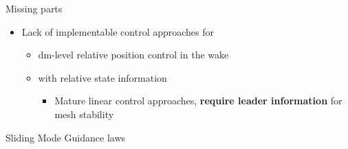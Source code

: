 \documentclass[12pt,svgnames,table,draft=false]{beamer}
\begin{document}
\begin{frame}{Missing parts}
\centering
\vspace{-6em}
\begin{tcolorbox}[width=.99\textwidth,
colback={gray!10!},
standard jigsaw,
opacityback=1,  %
]  
\begin{itemize}
\item Lack of implementable control approaches for 
\begin{itemize}
\item dm-level relative position control in the wake 
\item with relative state information
\begin{itemize}
\item Mature linear control approaches, \textbf{require leader information} for mesh stability
\end{itemize}
\end{itemize}
\end{itemize}
\end{tcolorbox}
\end{frame}

\usebackgroundtemplate{}
\begin{frame}
\centering
\Large
\vspace{3em}
Sliding Mode Guidance laws
\end{frame}

\end{document}
